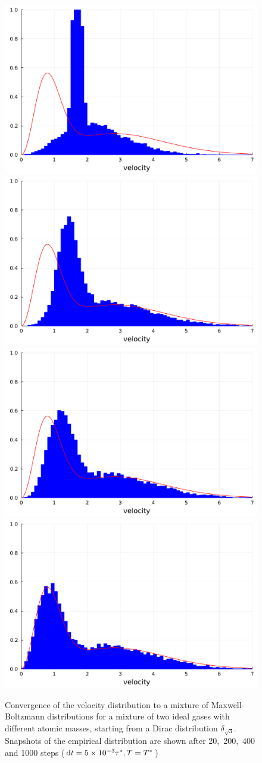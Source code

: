     \begin{figure}[htbp]
        \begin{center}
            \includegraphics[width=0.49\linewidth]{figures/chapter1/velocities_20.pdf}
            \includegraphics[width=0.49\linewidth]{figures/chapter1/velocities_200.pdf}
            \includegraphics[width=0.49\linewidth]{figures/chapter1/velocities_400.pdf}
            \includegraphics[width=0.49\linewidth]{figures/chapter1/velocities_1000.pdf}
          \caption{ \label{fig:velocity_histograms}
            Convergence of the velocity distribution to a mixture of Maxwell-Boltzmann distributions for a mixture of two ideal gases with different atomic masses, starting from a Dirac distribution $\delta_{\sqrt 3}$. Snapshots of the empirical distribution are shown after 20,\ 200,\ 400 and 1000 steps ($\text dt=5\times 10^{-3} \tau ^*, T=T^*$)          }
        \end{center}
      \end{figure}


